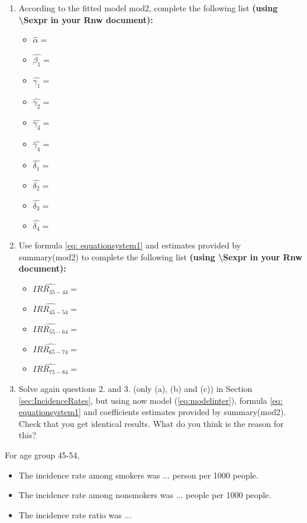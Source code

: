 \documentclass[10pt,a4paper,twoside]{article}\usepackage[]{graphicx}\usepackage[]{xcolor}
\begin{document}
\begin{enumerate}
According to the p-value = 0.0164 < 0.05, we reject the null hypothesis. Accordingly, from now on, we discard model (\ref{eq:modelmain}) and \textbf{continue the exercise using model} (\ref{eq:modelinter}) (\textbf{i.e., the fitted model} mod2). As a consequence, we are assuming that age is an
effect modifier.

\item According to the fitted model mod2, complete the following list \textbf{(using \textbackslash{Sexpr} in your Rnw document):}
\begin{itemize}
    \item $\hat{\alpha}=$
    \item $\hat{\beta_{1}} =$
    \item $\hat{\gamma_{1}} =$
    \item $\hat{\gamma_{2}}=$
    \item $\hat{\gamma_{3}}=$
    \item $\hat{\gamma_{4}}=$
    \item $\hat{\delta_{1}}=$
    \item $\hat{\delta_{2}}=$
    \item $\hat{\delta_{3}}=$
    \item $\hat{\delta_{4}}=$
\end{itemize}
    \item Use formula \ref{eq: equationsystem1} and estimates provided by summary(mod2) to complete the following list \textbf{(using \textbackslash{Sexpr} in your Rnw document):}
    \begin{itemize}
        \item $\widehat{IRR_{35-44}} =$
        \item $\widehat{IRR_{45-54}}=$
        \item $\widehat{IRR_{55-64}}=$
        \item $\widehat{IRR_{65-74}} =$
        \item $\widehat{IRR_{75-84}} =$
    \end{itemize}
\item Solve again questions 2. and 3. (only (a), (b) and (c)) in Section \ref{sec:IncidenceRates}, but using now
model (\ref{eq:modelinter}), formula \ref{eq: equationsystem1} and coefficients estimates provided by summary(mod2). Check that you get identical results. What do you think is the reason for this?
\end{enumerate}
For age group 45-54,\begin{itemize} 
    \item The incidence rate among smokers was ... person per 1000 people.
    \item The incidence rate among nonsmokers was ... people per 1000 people.
    \item The incidence rate ratio was ... 
\end{itemize}
\end{document}
